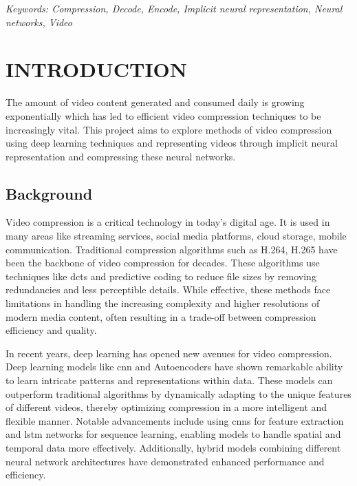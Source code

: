 \documentclass{ioereport}
\begin{document}
    \textit{Keywords: Compression, Decode, Encode, Implicit neural representation, Neural networks, Video}

    \pagebreak
    
    \tableofcontents
    \pagebreak
    
    \listoffigures
    \pagebreak
    
    \listoftables
    \pagebreak

    \doublespacing
    \printglossary[type=\acronymtype,style=acronyms-only,title=List of Abbreviations{\vspace{0.15\baselineskip}}]
    \onehalfspacing


\mainsection

\section{\MakeUppercase{Introduction}}
The amount of video content generated and consumed daily is growing exponentially \cite{biteable2021} which has led to efficient video compression techniques to be increasingly vital. This project aims to explore methods of video compression using deep learning techniques and representing videos through implicit neural representation and compressing these neural networks.
    
    \subsection{Background}
    Video compression is a critical technology in today’s digital age. It is used in many areas like streaming services, social media platforms, cloud storage, mobile communication. Traditional compression algorithms such as H.264, H.265 have been the backbone of video compression for decades. These algorithms use techniques like \gls{dct}s and predictive coding to reduce file sizes by removing redundancies and less perceptible details. While effective, these methods face limitations in handling the increasing complexity and higher resolutions of modern media content, often resulting in a trade-off between compression efficiency and quality.

    In recent years, deep learning has opened new avenues for video compression. Deep learning models like \gls{cnn} and Autoencoders have shown remarkable ability to learn intricate patterns and representations within data. These models can outperform traditional algorithms by dynamically adapting to the unique features of different videos, thereby optimizing compression in a more intelligent and flexible manner. Notable advancements include using \gls{cnn}s for feature extraction and \gls{lstm} networks for sequence learning, enabling models to handle spatial and temporal data more effectively. Additionally, hybrid models combining different neural network architectures have demonstrated enhanced performance and efficiency. 
    
\end{document}
